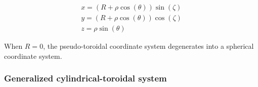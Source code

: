 \vspace*{-12pt}

\begin{gather}
    x=(R+\rho\cos(\theta))\sin(\zeta)\\
    y=(R+\rho\cos(\theta))\cos(\zeta)\\
    z=\rho\sin(\theta)
\end{gather}

\vspace*{-2pt}

When $R=0$, the pseudo-toroidal coordinate system degenerates into a spherical coordinate system.

\subsubsection{Generalized cylindrical-toroidal system}

